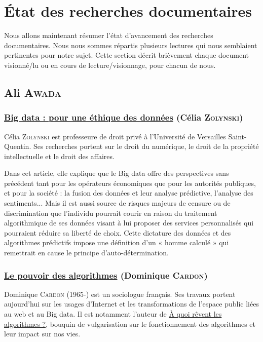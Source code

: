 \documentclass[a4paper,10pt]{article}
\begin{document}
\section{État des recherches documentaires}
\label{section_lectures}

Nous allons maintenant résumer l'état d'avancement des recherches documentaires. Nous nous sommes répartis plusieurs lectures qui nous semblaient pertinentes pour notre sujet. Cette section décrit brièvement chaque document visionné/lu ou en cours de lecture/visionnage, pour chacun de nous.

\subsection{Ali \textsc{Awada}}

\subsubsection{\underline{Big data : pour une éthique des données} (Célia \textsc{Zolynski})}

Célia \textsc{Zolynski} est professeure de droit privé à l'Université de Versailles Saint-Quentin. Ses recherches portent sur le droit du numérique, le droit de la propriété intellectuelle et le droit des affaires.

Dans cet article, elle explique que le Big data offre des perspectives sans précédent tant pour les opérateurs économiques que pour les autorités publiques, et pour la société : la fusion des données et leur analyse prédictive, l'analyse des sentiments... Mais il est aussi source de risques majeurs de censure ou de discrimination que l’individu pourrait courir en raison du traitement algorithmique de ses données visant à lui proposer des services personnalisés qui pourraient réduire sa liberté de choix. Cette dictature des données et des algorithmes prédictifs impose une définition d’un « homme calculé » qui remettrait en cause le principe d’auto-détermination.

\subsubsection{\underline{Le pouvoir des algorithmes} (Dominique \textsc{Cardon})}

Dominique \textsc{Cardon} (1965-) est un sociologue français. Ses travaux portent aujourd'hui sur les usages d’Internet et les transformations de l’espace public liées au web et au Big data. Il est notamment l'auteur de \underline{À quoi rêvent les algorithmes ?}, bouquin de vulgarisation sur le fonctionnement des algorithmes et leur impact sur nos vies. 
\end{document}
